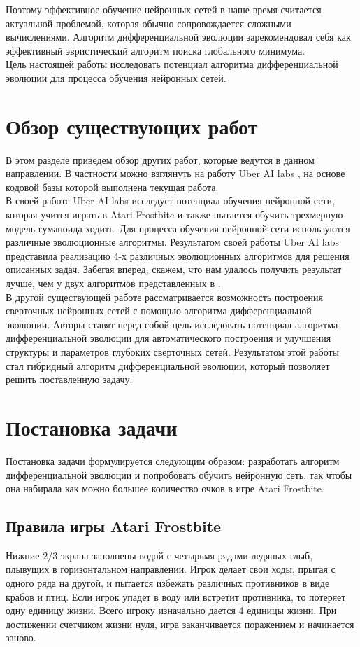 \documentclass[12pt]{article}
\begin{document}
    Поэтому эффективное обучение нейронных сетей в наше время считается актуальной проблемой, которая обычно сопровождается сложными вычислениями. Алгоритм дифференциальной эволюции зарекомендовал себя как эффективный эвристический алгоритм поиска глобального минимума. \\
    
    Цель настоящей работы исследовать потенциал алгоритма дифференциальной эволюции для процесса обучения нейронных сетей. 

\section{Обзор существующих работ}
    В этом разделе приведем обзор других работ, которые ведутся в данном направлении. В частности можно взглянуть на работу Uber AI labs \cite{uber}, на основе кодовой базы которой выполнена текущая работа. \\

    В своей работе Uber AI labs исследует потенциал обучения нейронной сети, которая учится играть в Atari Frostbite и также пытается обучить трехмерную модель гуманоида ходить. Для процесса обучения нейронной сети используются различные эволюционные алгоритмы. Результатом своей работы Uber AI labs представила реализацию 4-х различных эволюционных алгоритмов для решения описанных задач. Забегая вперед, скажем, что нам удалось получить результат лучше, чем у двух алгоритмов представленных в \cite{uber}. \\

    В другой существующей работе \cite{de-for-cnn-design} рассматривается возможность построения сверточных нейронных сетей с помощью алгоритма дифференциальной эволюции. Авторы ставят перед собой цель исследовать потенциал алгоритма дифференциальной эволюции для автоматического построения и улучшения структуры и параметров глубоких сверточных сетей. Результатом этой работы стал гибридный алгоритм дифференциальной эволюции, который позволяет решить поставленную задачу.

\section{Постановка задачи}
    Постановка задачи формулируется следующим образом: разработать алгоритм дифференциальной эволюции и попробовать обучить нейронную сеть, так чтобы она набирала как можно большее количество очков в игре Atari Frostbite.

    \subsection{Правила игры Atari Frostbite}
    Нижние $2/3$ экрана заполнены водой с четырьмя рядами ледяных глыб, плывущих в горизонтальном направлении. Игрок делает свои ходы, прыгая с одного ряда на другой, и пытается избежать различных противников в виде крабов и птиц. Если игрок упадет в воду или встретит противника, то потеряет одну единицу жизни. Всего игроку изначально дается 4 единицы жизни. При достижении счетчиком жизни нуля, игра заканчивается поражением и начинается заново.  \\
\end{document}
